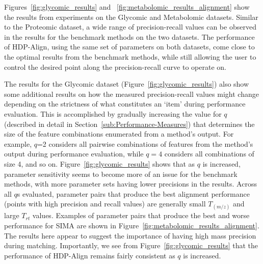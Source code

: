 Figures~\ref{fig:glycomic_results} and ~\ref{fig:metabolomic_results_alignment} show the results from experiments on the Glycomic and Metabolomic datasets. Similar to the Proteomic dataset, a wide range of precision-recall values can be observed in the results for the benchmark methods on the two datasets. The performance of HDP-Align, using the same set of parameters on both datasets, come close to the optimal results from the benchmark methods, while still allowing the user to control the desired point along the precision-recall curve to operate on.

The results for the Glycomic dataset (Figure~\ref{fig:glycomic_results}) also show some additional results on how the measured precision-recall values might change depending on the strictness of what constitutes an `item' during performance evaluation. This is accomplished by gradually increasing the value for $q$ (described in detail in Section~\ref{sub:Performance-Measures}) that determines the size of the feature combinations enumerated from a method's output. For example, $q$=2 considers all pairwise combinations of features from the method's output during performance evaluation, while $q=4$ considers all combinations of size 4, and so on. Figure~\ref{fig:glycomic_results} shows that as $q$ is increased, parameter sensitivity seems to become more of an issue for the benchmark methods, with more parameter sets having lower precisions in the results. Across all $q$s evaluated, parameter pairs that produce the best alignment performance (points with high precision and recall values) are generally small $T_{(m/z)}$ and large $T_{rt}$ values. Examples of parameter pairs that produce the best and worse performance for SIMA are shown in Figure~\ref{fig:metabolomic_results_alignment}. The results here appear to suggest the importance of having high mass precision during matching. Importantly, we see from Figure~\ref{fig:glycomic_results} that the performance of HDP-Align remains fairly consistent as $q$ is increased.

